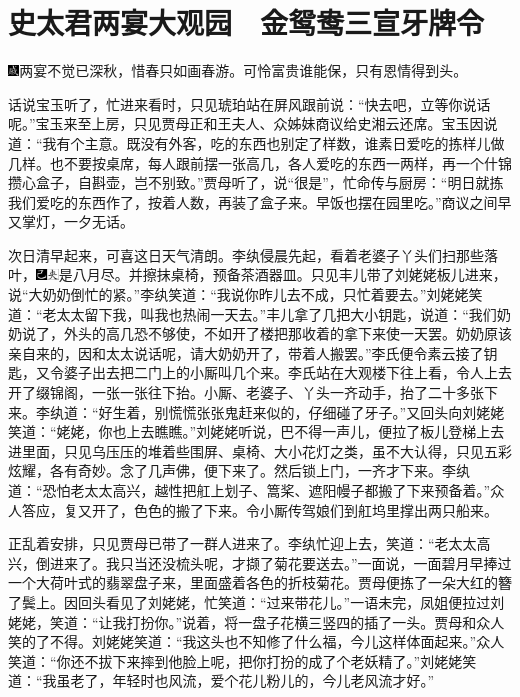 

\chapter{史太君两宴大观园　金鸳鸯三宣牙牌令}\label{part0044_split_000.htmlux5cux23calibre_pb_0}

{\includegraphics[width=3mm]{../Images/00005}两宴不觉已深秋，惜春只如画春游。可怜富贵谁能保，只有恩情得到头。}

话说宝玉听了，忙进来看时，只见琥珀站在屏风跟前说：``快去吧，立等你说话呢。''宝玉来至上房，只见贾母正和王夫人、众姊妹商议给史湘云还席。宝玉因说道：``我有个主意。既没有外客，吃的东西也别定了样数，谁素日爱吃的拣样儿做几样。也不要按桌席，每人跟前摆一张高几，各人爱吃的东西一两样，再一个什锦攒心盒子，自斟壶，岂不别致。''贾母听了，说``很是''，忙命传与厨房：``明日就拣我们爱吃的东西作了，按着人数，再装了盒子来。早饭也摆在园里吃。''商议之间早又掌灯，一夕无话。

次日清早起来，可喜这日天气清朗。李纨侵晨先起，看着老婆子丫头们扫那些落叶，{\includegraphics[width=3mm]{../Images/00003}\includegraphics[width=3mm]{../Images/00012}\footnotesize \kaishu 是八月尽。}并擦抹桌椅，预备茶酒器皿。只见丰儿带了刘姥姥板儿进来，说``大奶奶倒忙的紧。''李纨笑道：``我说你昨儿去不成，只忙着要去。''刘姥姥笑道：``老太太留下我，叫我也热闹一天去。''丰儿拿了几把大小钥匙，说道：``我们奶奶说了，外头的高几恐不够使，不如开了楼把那收着的拿下来使一天罢。奶奶原该亲自来的，因和太太说话呢，请大奶奶开了，带着人搬罢。''李氏便令素云接了钥匙，又令婆子出去把二门上的小厮叫几个来。李氏站在大观楼下往上看，令人上去开了缀锦阁，一张一张往下抬。小厮、老婆子、丫头一齐动手，抬了二十多张下来。李纨道：``好生着，别慌慌张张鬼赶来似的，仔细碰了牙子。''又回头向刘姥姥笑道：``姥姥，你也上去瞧瞧。''刘姥姥听说，巴不得一声儿，便拉了板儿登梯上去进里面，只见乌压压的堆着些围屏、桌椅、大小花灯之类，虽不大认得，只见五彩炫耀，各有奇妙。念了几声佛，便下来了。然后锁上门，一齐才下来。李纨道：``恐怕老太太高兴，越性把舡上划子、篙桨、遮阳幔子都搬了下来预备着。''众人答应，复又开了，色色的搬了下来。令小厮传驾娘们到舡坞里撑出两只船来。

正乱着安排，只见贾母已带了一群人进来了。李纨忙迎上去，笑道：``老太太高兴，倒进来了。我只当还没梳头呢，才撷了菊花要送去。''一面说，一面碧月早捧过一个大荷叶式的翡翠盘子来，里面盛着各色的折枝菊花。贾母便拣了一朵大红的簪了鬓上。因回头看见了刘姥姥，忙笑道：``过来带花儿。''一语未完，凤姐便拉过刘姥姥，笑道：``让我打扮你。''说着，将一盘子花横三竖四的插了一头。贾母和众人笑的了不得。刘姥姥笑道：``我这头也不知修了什么福，今儿这样体面起来。''众人笑道：``你还不拔下来摔到他脸上呢，把你打扮的成了个老妖精了。''刘姥姥笑道：``我虽老了，年轻时也风流，爱个花儿粉儿的，今儿老风流才好。''

